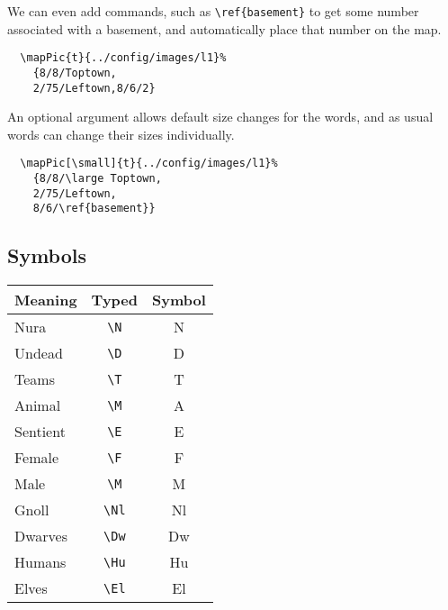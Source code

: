 \documentclass[a4paper,openany]{book}
\begin{document}
\begin{multicols}{2}
We can even add commands, such as \verb"\ref{basement}" to get some number associated with a basement, and automatically place that number on the map.

\begin{verbatim}
  \mapPic{t}{../config/images/l1}%
    {8/8/Toptown,
    2/75/Leftown,8/6/2}
\end{verbatim}

An optional argument allows default size changes for the words, and as usual words can change their sizes individually.

\begin{verbatim}
  \mapPic[\small]{t}{../config/images/l1}%
    {8/8/\large Toptown,
    2/75/Leftown,
    8/6/\ref{basement}}
\end{verbatim}

\subsection{Symbols}

\begin{tabularx}{\linewidth}{Xcc}

  Meaning & Typed & Symbol \\\hline

  Nura & {\tt \textbackslash{N}} & \gls{N} \\

  Undead & {\tt \textbackslash{D}} & \gls{D} \\
  \hline
  Teams & {\tt \textbackslash{T}} & \gls{T} \\

  Animal & {\tt \textbackslash{M}} & \gls{A} \\

  Sentient & {\tt \textbackslash{E}} & \gls{E} \\

  Female & {\tt \textbackslash{F}} & \gls{F} \\

  Male & {\tt \textbackslash{M}} & \gls{M} \\

  \hline
  Gnoll & {\tt \textbackslash{Nl}} & \gls{Nl} \\

  Dwarves & {\tt \textbackslash{Dw}} & \gls{Dw} \\

  Humans & {\tt \textbackslash{Hu}} & \gls{Hu} \\

  Elves & {\tt \textbackslash{El}} & \gls{El} \\


\end{tabularx}
\end{multicols}
\end{document}
